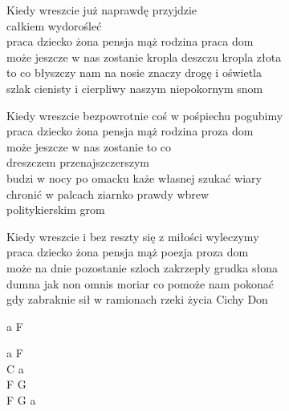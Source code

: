 \begin{text}
    \small{
    Kiedy wreszcie już naprawdę przyjdzie\\
    \vin\vin\vin\vin\vin\vin całkiem wydorośleć\\
    praca dziecko żona pensja mąż rodzina praca dom\\
    może jeszcze w nas zostanie kropla deszczu kropla złota\\
    to co błyszczy nam na nosie znaczy drogę i oświetla\\
    szlak cienisty i cierpliwy naszym niepokornym snom

    Kiedy wreszcie bezpowrotnie coś w pośpiechu pogubimy\\
    praca dziecko żona pensja mąż rodzina proza dom\\
    może jeszcze w nas zostanie to co\\
    \vin\vin\vin\vin\vin\vin dreszczem przenajszczerszym\\
    budzi w nocy po omacku każe własnej szukać wiary\\
    chronić w palcach ziarnko prawdy wbrew\\
    \vin\vin\vin\vin\vin\vin politykierskim grom

    Kiedy wreszcie i bez reszty się z miłości wyleczymy\\
    praca dziecko żona pensja mąż poezja proza dom\\
    może na dnie pozostanie szloch zakrzepły grudka słona\\
    dumna jak non omnis moriar co pomoże nam pokonać\\
    gdy zabraknie sił w ramionach rzeki życia Cichy Don
    }
\end{text}
\begin{chord}
    \small{
    a F

    a F\\
    C a\\
    F G\\
    F G a
    }
\end{chord}